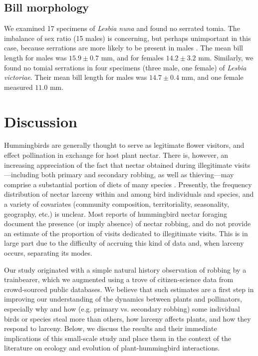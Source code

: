 \documentclass[fleqn,10pt,lineno]{wlpeerj}
\begin{document}
\subsection*{Bill morphology}
We examined 17 specimens of \textit{Lesbia nuna} and found no serrated tomia. %
The imbalance of sex ratio (15 males) is concerning, but perhaps unimportant in this case, because serrations are more likely to be present in males \citep{rico-guevara2019}. 
The mean bill length for males was $15.9 \pm 0.7$ mm, and for females $14.2 \pm 3.2$ mm. Similarly, we found no tomial serrations in four specimens (three male, one female) of \textit{Lesbia victoriae}. 
Their mean bill length for males was $14.7 \pm 0.4$ mm, and one female measured $11.0$ mm.


\section*{Discussion}

%
%
Hummingbirds are generally thought to serve as legitimate flower visitors, and effect pollination in exchange for host plant nectar. 
There is, however, an increasing appreciation of the fact that nectar obtained during illegitimate visits---including both primary and secondary robbing, as well as thieving---may comprise a substantial portion of diets of many species \citep{lara2001,irwin2010,boehm2018}. 
Presently, the frequency distribution of nectar larceny within and among bird individuals and species, and a variety of covariates (community composition, territoriality, seasonality, geography, etc.) is unclear. 
Most reports of hummingbird nectar foraging document the presence (or imply absence) of nectar robbing, and do not provide an estimate of the proportion of visits dedicated to illegitimate visits. 
This is in large part due to the difficulty of accruing this kind of data and, when larceny occurs, separating its modes.  

%
%
Our study originated with a simple natural history observation of robbing by a trainbearer, which we  augmented using a trove of citizen-science data from crowd-sourced public databases. We believe that such estimates are a first step in improving our understanding of the dynamics between plants and pollinators, especially why and how (e.g. primary vs. secondary robbing) some individual birds or species steal more than others, how larceny affects plants, and how they respond to larceny. Below, we discuss the results and their immediate implications of this small-scale study and place them in the context of the literature on ecology and evolution of plant-hummingbird interactions.
\end{document}
